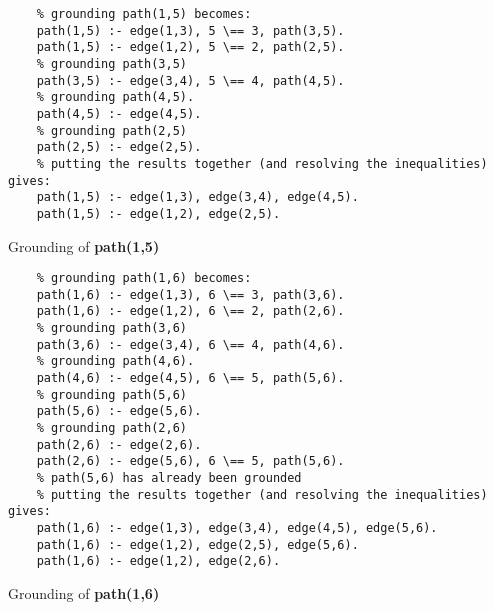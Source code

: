 \begin{listing}[H]
    \centering
    \begin{verbatim}
    % grounding path(1,5) becomes:
    path(1,5) :- edge(1,3), 5 \== 3, path(3,5).
    path(1,5) :- edge(1,2), 5 \== 2, path(2,5).
    % grounding path(3,5)
    path(3,5) :- edge(3,4), 5 \== 4, path(4,5).
    % grounding path(4,5).
    path(4,5) :- edge(4,5).
    % grounding path(2,5)
    path(2,5) :- edge(2,5).
    % putting the results together (and resolving the inequalities) gives:
    path(1,5) :- edge(1,3), edge(3,4), edge(4,5).
    path(1,5) :- edge(1,2), edge(2,5).
    \end{verbatim}
    \caption{Grounding of \textbf{path(1,5)}}\label{lst:query15}
\end{listing}

\begin{listing}[H]
    \centering
    \begin{verbatim}
    % grounding path(1,6) becomes:
    path(1,6) :- edge(1,3), 6 \== 3, path(3,6).
    path(1,6) :- edge(1,2), 6 \== 2, path(2,6).
    % grounding path(3,6)
    path(3,6) :- edge(3,4), 6 \== 4, path(4,6).
    % grounding path(4,6).
    path(4,6) :- edge(4,5), 6 \== 5, path(5,6).
    % grounding path(5,6)
    path(5,6) :- edge(5,6).
    % grounding path(2,6)
    path(2,6) :- edge(2,6).
    path(2,6) :- edge(5,6), 6 \== 5, path(5,6).
    % path(5,6) has already been grounded
    % putting the results together (and resolving the inequalities) gives:
    path(1,6) :- edge(1,3), edge(3,4), edge(4,5), edge(5,6).
    path(1,6) :- edge(1,2), edge(2,5), edge(5,6).
    path(1,6) :- edge(1,2), edge(2,6).
    \end{verbatim}
    \caption{Grounding of \textbf{path(1,6)}}\label{lst:query16}
\end{listing}